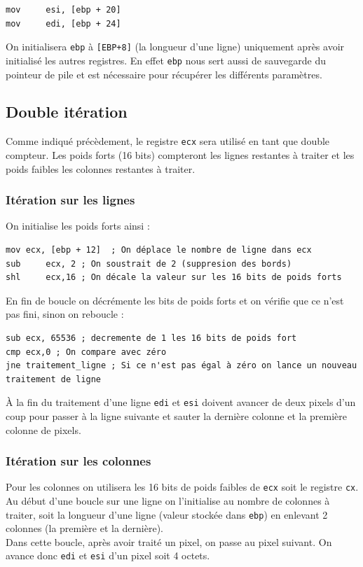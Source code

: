 \begin{lstlisting}[language={[x86masm]Assembler}]
mov     esi, [ebp + 20]
mov     edi, [ebp + 24]
\end{lstlisting}
On initialisera \lstinline{ebp} à \lstinline{[EBP+8]} (la longueur d'une ligne) uniquement après avoir initialisé les autres registres. En effet \lstinline{ebp} nous sert aussi de sauvegarde du pointeur de pile et est nécessaire pour récupérer les différents paramètres.

\subsection{Double itération}
Comme indiqué précèdement, le registre \lstinline{ecx} sera utilisé en tant que double compteur. Les poids forts (16 bits) compteront les lignes restantes à traiter et les poids faibles les colonnes restantes à traiter.

\subsubsection{Itération sur les lignes}
On initialise les poids forts ainsi :
\begin{lstlisting}[language={[x86masm]Assembler}]
mov ecx, [ebp + 12]  ; On déplace le nombre de ligne dans ecx
sub     ecx, 2 ; On soustrait de 2 (suppresion des bords)
shl     ecx,16 ; On décale la valeur sur les 16 bits de poids forts
\end{lstlisting}

En fin de boucle on décrémente les bits de poids forts et on vérifie que ce n'est pas fini, sinon on reboucle :
\begin{lstlisting}[language={[x86masm]Assembler}]
sub ecx, 65536 ; decremente de 1 les 16 bits de poids fort
cmp ecx,0 ; On compare avec zéro
jne traitement_ligne ; Si ce n'est pas égal à zéro on lance un nouveau traitement de ligne
\end{lstlisting}

À la fin du traitement d'une ligne \lstinline{edi} et \lstinline{esi} doivent avancer de deux pixels d'un coup pour passer à la ligne suivante et sauter la dernière colonne et la première colonne de pixels.

\subsubsection{Itération sur les colonnes}
Pour les colonnes on utilisera les 16 bits de poids faibles de \lstinline{ecx} soit le registre \lstinline{cx}. Au début d'une boucle sur une ligne on l'initialise au nombre de colonnes à traiter, soit la longueur d'une ligne (valeur stockée dans \lstinline{ebp}) en enlevant 2 colonnes (la première et la dernière).\\
Dans cette boucle, après avoir traité un pixel, on passe au pixel suivant. On avance donc \lstinline{edi} et \lstinline{esi} d'un pixel soit 4 octets.

